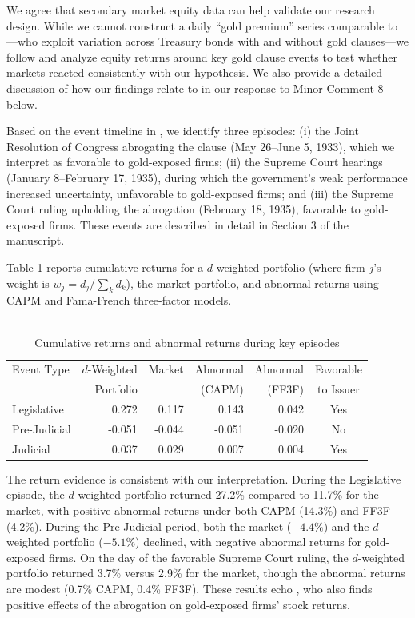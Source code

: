 \begin{itemize}
    We agree that secondary market equity data can help validate our research design. While we cannot construct a daily ``gold premium'' series comparable to \cite{Edwards2015}---who exploit variation across Treasury bonds with and without gold clauses---we follow \cite{Kroszner1999} and analyze equity returns around key gold clause events to test whether markets reacted consistently with our hypothesis. We also provide a detailed discussion of how our findings relate to \cite{Edwards2015} in our response to Minor Comment 8 below.

    Based on the event timeline in \cite{Edwards2018}, we identify three episodes: (i) the Joint Resolution of Congress abrogating the clause (May 26--June 5, 1933), which we interpret as favorable to gold-exposed firms; (ii) the Supreme Court hearings (January 8--February 17, 1935), during which the government's weak performance increased uncertainty, unfavorable to gold-exposed firms; and (iii) the Supreme Court ruling upholding the abrogation (February 18, 1935), favorable to gold-exposed firms. These events are described in detail in Section 3 of the manuscript.
    
    Table \ref{tab:market_metrics} reports cumulative returns for a $d$-weighted portfolio (where firm $j$'s weight is $w_j = d_j / \sum_k d_k$), the market portfolio, and abnormal returns using CAPM and Fama-French three-factor models.
    
    \begin{table}[h]
    \centering
    \begin{tabular}{lrrrrc}
    \toprule
    Event Type & $d$-Weighted & Market & Abnormal & Abnormal & Favorable \\
     & Portfolio & & (CAPM) & (FF3F) & to Issuer \\
    \midrule
    Legislative & 0.272 & 0.117 & 0.143 & 0.042 & Yes \\
    Pre-Judicial & -0.051 & -0.044 & -0.051 & -0.020 & No \\
    Judicial & 0.037 & 0.029 & 0.007 & 0.004 & Yes \\
    \bottomrule
    \end{tabular}
    \caption{\\Cumulative returns and abnormal returns during key episodes}
    \label{tab:market_metrics}
    \end{table}
    
    The return evidence is consistent with our interpretation. During the Legislative episode, the $d$-weighted portfolio returned 27.2\% compared to 11.7\% for the market, with positive abnormal returns under both CAPM (14.3\%) and FF3F (4.2\%). During the Pre-Judicial period, both the market ($-4.4\%$) and the $d$-weighted portfolio ($-5.1\%$) declined, with negative abnormal returns for gold-exposed firms. On the day of the favorable Supreme Court ruling, the $d$-weighted portfolio returned 3.7\% versus 2.9\% for the market, though the abnormal returns are modest (0.7\% CAPM, 0.4\% FF3F). These results echo \cite{Kroszner1999}, who also finds positive effects of the abrogation on gold-exposed firms' stock returns.


\end{itemize}
